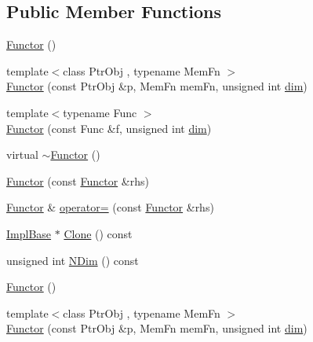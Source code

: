 \subsection*{Public Member Functions}
\begin{DoxyCompactItemize}
\item 
\mbox{\hyperlink{classROOT_1_1Math_1_1Functor_a2330648eca94b53b3ba613e49d03927f}{Functor}} ()
\item 
{\footnotesize template$<$class Ptr\+Obj , typename Mem\+Fn $>$ }\\\mbox{\hyperlink{classROOT_1_1Math_1_1Functor_ad6dbce8351bd8c74e6754215a3ccac41}{Functor}} (const Ptr\+Obj \&p, Mem\+Fn mem\+Fn, unsigned int \mbox{\hyperlink{adat__devel_2lib_2hadron_2irrep__util_8cc_a70b5e28b5bc3d1b63a7435c5fe50b837}{dim}})
\item 
{\footnotesize template$<$typename Func $>$ }\\\mbox{\hyperlink{classROOT_1_1Math_1_1Functor_a82af0df828055f18310af5d49dcc3aa2}{Functor}} (const Func \&f, unsigned int \mbox{\hyperlink{adat__devel_2lib_2hadron_2irrep__util_8cc_a70b5e28b5bc3d1b63a7435c5fe50b837}{dim}})
\item 
virtual \mbox{\hyperlink{classROOT_1_1Math_1_1Functor_a349935f827a453deb17fdad728849028}{$\sim$\+Functor}} ()
\item 
\mbox{\hyperlink{classROOT_1_1Math_1_1Functor_a001bfe27e95032f05685167e77e0efbd}{Functor}} (const \mbox{\hyperlink{classROOT_1_1Math_1_1Functor}{Functor}} \&rhs)
\item 
\mbox{\hyperlink{classROOT_1_1Math_1_1Functor}{Functor}} \& \mbox{\hyperlink{classROOT_1_1Math_1_1Functor_a24bd9cdf7e31e443bff64c5fb4378c99}{operator=}} (const \mbox{\hyperlink{classROOT_1_1Math_1_1Functor}{Functor}} \&rhs)
\item 
\mbox{\hyperlink{classROOT_1_1Math_1_1Functor_acc5dacb213f26296122e95138f5153b3}{Impl\+Base}} $\ast$ \mbox{\hyperlink{classROOT_1_1Math_1_1Functor_a989f9b6dd160ebe03911cdee00dacaad}{Clone}} () const
\item 
unsigned int \mbox{\hyperlink{classROOT_1_1Math_1_1Functor_a2544e2ed3c6a0420084c7b08eb3c3130}{N\+Dim}} () const
\item 
\mbox{\hyperlink{classROOT_1_1Math_1_1Functor_a2330648eca94b53b3ba613e49d03927f}{Functor}} ()
\item 
{\footnotesize template$<$class Ptr\+Obj , typename Mem\+Fn $>$ }\\\mbox{\hyperlink{classROOT_1_1Math_1_1Functor_ad6dbce8351bd8c74e6754215a3ccac41}{Functor}} (const Ptr\+Obj \&p, Mem\+Fn mem\+Fn, unsigned int \mbox{\hyperlink{adat__devel_2lib_2hadron_2irrep__util_8cc_a70b5e28b5bc3d1b63a7435c5fe50b837}{dim}})

\end{DoxyCompactItemize}
